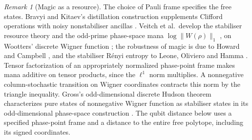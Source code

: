 \documentclass[aps,pra,onecolumn,superscriptaddress,nofootinbib,10pt]{revtex4-2}
\theoremstyle{definition}
\theoremstyle{remark}
\newtheorem{remark}[theorem]{Remark}
\begin{document}
\begin{remark}[Magic as a resource]\label{ob:magicresources}
The choice of Pauli frame specifies the free states. Bravyi and Kitaev's
distillation construction supplements Clifford operations with noisy
nonstabiliser ancillas \cite{obr:bk}. Veitch et al.\ develop the
stabiliser resource theory and the odd-prime phase-space mana
\(\log\|W(\rho)\|_1\) \cite{obr:veitch}, on Wootters' discrete Wigner function \cite{rf:Wootters1987}; the robustness of
magic is due to Howard and Campbell \cite{rf:Howard2017}, and the stabiliser R\'enyi entropy to Leone, Oliviero and Hamma
\cite{rf:Leone2022}. Tensor factorization of an
appropriately normalized phase-point frame makes mana additive on
tensor products, since the \(\ell^1\) norm multiplies. A nonnegative
column-stochastic transition on Wigner coordinates contracts this
norm by the triangle inequality. Gross's odd-dimensional discrete
Hudson theorem characterizes pure states of nonnegative Wigner
function as stabiliser states in its odd-dimensional phase-space
construction \cite[Theorem~2]{obr:gross}. The qubit distance below
uses a specified phase-point frame and a distance to the entire free
polytope, including its signed coordinates.
\end{remark}
\end{document}
